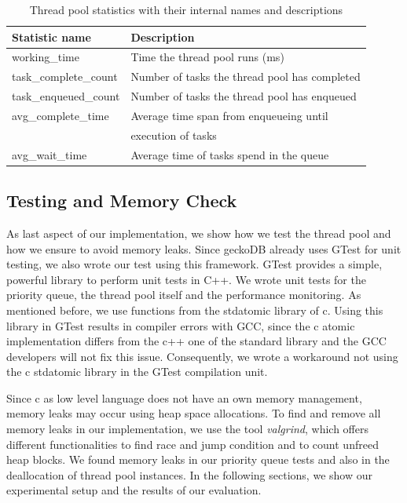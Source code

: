 \documentclass[conference]{IEEEtran}
\begin{document}
\begin{table}[htbp]
	\caption{Thread pool statistics with their internal names and descriptions}
	\begin{center}
		\begin{tabular}{ l l }
			\hline
			\textbf{Statistic name}&\textbf{Description}\\
			\hline
			working\_time & Time the thread pool runs (ms) \\
			task\_complete\_count & Number of tasks the thread pool has completed\\
			task\_enqueued\_count & Number of tasks the thread pool has enqueued \\
			avg\_complete\_time & Average time span from enqueueing until \\
			& execution of tasks \\
			avg\_wait\_time & Average time of tasks spend in the queue \\
			\hline
		\end{tabular}
		\label{tab4}
	\end{center}
\end{table}

\subsection{Testing and Memory Check}
As last aspect of our implementation, we show how we test the thread pool and how we ensure to avoid memory leaks. Since geckoDB already uses GTest \cite{sen2010quick} for unit testing, we also wrote our test using this framework. GTest provides a simple, powerful library to perform unit tests in C++. We wrote unit tests for the priority queue, the thread pool itself and the performance monitoring. As mentioned before, we use functions from the stdatomic library of c. Using this library in GTest results in compiler errors with GCC, since the c atomic implementation differs from the c++ one of the standard library and the GCC developers will not fix this issue. Consequently, we wrote a workaround not using the c stdatomic library in the GTest compilation unit.

Since c as low level language does not have an own memory management, memory leaks may occur using heap space allocations. To find and remove all memory leaks in our implementation, we use the tool \emph{valgrind}, which offers different functionalities to find race and jump condition and to count unfreed heap blocks. We found memory leaks in our priority queue tests and also in the deallocation of thread pool instances. In the following sections, we show our experimental setup and the results of our evaluation.
\end{document}
